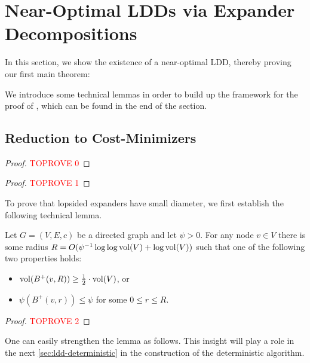 \section{Near-Optimal LDDs via Expander Decompositions} \label{sec:ldd-expander}

In this section, we show the existence of a near-optimal LDD, thereby proving our first main theorem: 

\thmMainExistential*

We introduce some technical lemmas in order to build up the framework for the proof of , which can be found in the end of the section.


\subsection{Reduction to Cost-Minimizers}

\mwu*

\begin{proof}\textcolor{red}{TOPROVE 0}\end{proof}

\lemLexpDecomp*

\begin{proof}\textcolor{red}{TOPROVE 1}\end{proof}

To prove that lopsided expanders have small diameter, we first establish the following technical lemma. 

\begin{lemma} \label{lem:lopsided-expansion}
Let $G = (V, E, c)$ be a directed graph and let $\psi > 0$. For any node $v \in V$ there is some radius $R = O(\psi^{-1} \log\log \operatorname{vol}(V) + \log \operatorname{vol}(V))$ such that one of the following two properties holds:
\begin{itemize}
	\item $\operatorname{vol}(B^+(v, R)) \geq \frac{1}{2} \cdot \operatorname{vol}(V)$, or
	\item $\psi(B^+(v, r)) \leq \psi$ for some $0 \leq r \leq R$.
\end{itemize}
\end{lemma}
\begin{proof}\textcolor{red}{TOPROVE 2}\end{proof}

One can easily strengthen the lemma as follows. This insight will play a role in the next \cref{sec:ldd-deterministic} in the construction of the deterministic algorithm.

